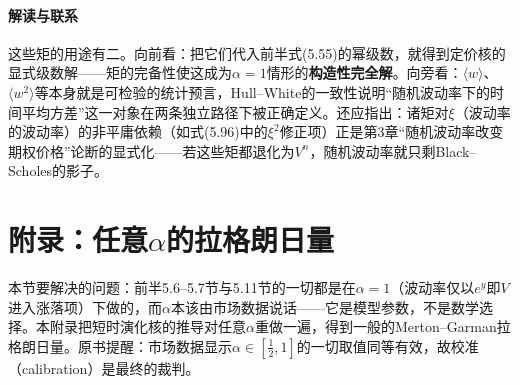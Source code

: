 \paragraph{解读与联系}
这些矩的用途有二。向前看：把它们代入前半式(5.55)的幂级数，就得到定价核的显式级数解——矩的完备性使这成为$\alpha=1$情形的\textbf{构造性完全解}。向旁看：$\langle w\rangle$、$\langle w^{2}\rangle$等本身就是可检验的统计预言，Hull--White的一致性说明“随机波动率下的时间平均方差”这一对象在两条独立路径下被正确定义。还应指出：诸矩对$\xi$（波动率的波动率）的非平庸依赖（如式(5.96)中的$\xi^{2}$修正项）正是第3章“随机波动率改变期权价格”论断的显式化——若这些矩都退化为$V^{n}$，随机波动率就只剩Black--Scholes的影子。

\section{附录：任意$\alpha$的拉格朗日量}

本节要解决的问题：前半5.6--5.7节与5.11节的一切都是在$\alpha=1$（波动率仅以$e^{y}$即$V$进入涨落项）下做的，而$\alpha$本该由市场数据说话——它是模型参数，不是数学选择。本附录把短时演化核的推导对任意$\alpha$重做一遍，得到一般的Merton--Garman拉格朗日量。原书提醒：市场数据显示$\alpha\in[\frac{1}{2},1]$的一切取值同等有效，故校准（calibration）是最终的裁判。

